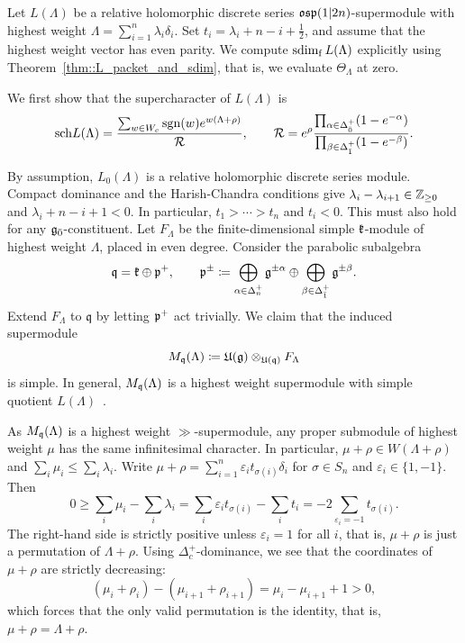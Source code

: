 \begin{example}
\label{ex::osp_one_formal_superdimension}
Let $L(\Lambda)$ be a relative holomorphic discrete series
${\mathfrak{osp}}(1\vert2n)$-supermodule with highest weight
$
\Lambda=\sum_{i=1}^n\lambda_i\delta_i.
$
Set $t_i=\lambda_i+n-i+\frac12$, and assume that the highest weight vector has even parity. We compute $\operatorname{sdim}_{\mathrm f} L(\Lambda)$ explicitly using Theorem~\ref{thm::L_packet_and_sdim}, that is, we evaluate $\Theta_{\Lambda}$ at zero.

We first show that the supercharacter of $L(\Lambda)$ is 
\begin{equation}\label{eq::supercharacter_osp}
{\operatorname{sch}} L(\Lambda)
=
\frac{
\sum_{w\in W_c}\operatorname{sgn}(w)e^{w(\Lambda+\rho)}
}{\mathcal R}, \qquad \mathcal R
=
e^\rho
\frac{\prod_{\alpha\in\Delta_{\bar0}^+}(1-e^{-\alpha})}
     {\prod_{\beta\in\Delta_{\bar1}^+}(1-e^{-\beta})}.
\end{equation}


By assumption, $L_{0}(\Lambda)$ is a relative holomorphic discrete series module. Compact dominance and the Harish-Chandra conditions give
$\lambda_i-\lambda_{i+1}\in{\mathbb Z}_{\geq0}$ and
$\lambda_i+n-i+1<0$. In particular,
$t_1>\cdots>t_n$ and $t_i<0$. This must also hold for any ${\mathfrak{g}_{\bar{0}}}$-constituent. Let $F_\Lambda$ be the finite-dimensional simple
${\mathfrak k}$-module of highest weight $\Lambda$, placed in
even degree. Consider the parabolic subalgebra
\begin{equation*}
\mathfrak q
=
{\mathfrak k}\oplus {\mathfrak p}^{+}, \qquad {\mathfrak p}^{\pm} \coloneqq
\bigoplus_{\alpha\in\Delta_n^+}{\mathfrak{g}}^{\pm\alpha}
\oplus
\bigoplus_{\beta\in\Delta_{\bar1}^+}{\mathfrak{g}}^{\pm\beta}.
\end{equation*}
Extend $F_\Lambda$ to $\mathfrak q$ by letting ${\mathfrak p}^{+}$ act trivially. We claim that the induced supermodule
\begin{equation*}
M_{{\mathfrak q}}(\Lambda)
\coloneqq
{\mathfrak U}({\mathfrak{g}})\otimes_{{\mathfrak U}(\mathfrak q)}F_\Lambda
\end{equation*}
is simple. In general, $M_{{\mathfrak q}}(\Lambda)$ is a highest weight supermodule with simple
quotient $L(\Lambda)$~\cite{Carmeli_Fioresi_Varadarajan_HW}.

As $M_{{\mathfrak q}}(\Lambda)$ is a highest weight $\gg$-supermodule, any proper submodule of highest weight $\mu$ has the same infinitesimal character. In particular, $\mu+\rho\in W(\Lambda+\rho)$ and $\sum_{i}\mu_{i}\leq \sum_{i}\lambda_{i}$. Write
$\mu+\rho
=
\sum_{i=1}^n\varepsilon_i t_{\sigma(i)}\delta_i$ for $\sigma\in S_n$ and $\varepsilon_i\in\{1,-1\}.
$
Then
\begin{equation*}
0
\geq
\sum_i\mu_i-\sum_i\lambda_i
=
\sum_i\varepsilon_i t_{\sigma(i)}-\sum_i t_i
=
-2\sum_{\varepsilon_i=-1}t_{\sigma(i)}.
\end{equation*}
The right-hand side is strictly positive unless $\varepsilon_{i}=1$ for all $i$, that is, $\mu+\rho$ is just a permutation of $\Lambda+\rho$. Using $\Delta_{c}^{+}$-dominance, we see that the coordinates of $\mu+\rho$ are strictly
decreasing:
\begin{equation*}
(\mu_i+\rho_i)-(\mu_{i+1}+\rho_{i+1})
=
\mu_i-\mu_{i+1}+1>0,
\end{equation*}
which forces that the only valid permutation is the identity, that is, $\mu+\rho=\Lambda+\rho$.


\end{example}
